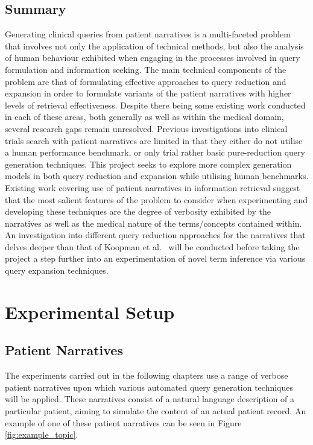 \documentclass[a4paper]{report}
\begin{document}
\section{Summary}

Generating clinical queries from patient narratives is a multi-faceted problem that involves not only the application of technical methods, but also the analysis of human behaviour exhibited when engaging in the processes involved in query formulation and information seeking. The main technical components of the problem are that of formulating effective approaches to query reduction and expansion in order to formulate variants of the patient narratives with higher levels of retrieval effectiveness. Despite there being some existing work conducted in each of these areas, both generally as well as within the medical domain, several research gaps remain unresolved. Previous investigations into clinical trials search with patient narratives are limited in that they either do not utilise a human performance benchmark, or only trial rather basic pure-reduction query generation techniques. This project seeks to explore more complex generation models in both query reduction and expansion while utilising human benchmarks. Existing work covering use of patient narratives in information retrieval suggest that the most salient features of the problem to consider when experimenting and developing these techniques are the degree of verbosity exhibited by the narratives as well as the medical nature of the terms/concepts contained within. An investigation into different query reduction approaches for the narratives that delves deeper than that of Koopman et al.~\cite{koopman2017generating} will be conducted before taking the project a step further into an experimentation of novel term inference via various query expansion techniques. 


\chapter{Experimental Setup}
\section{Patient Narratives}
The experiments carried out in the following chapters use a range of verbose patient narratives upon which various automated query generation techniques will be applied. These narratives consist of a natural language description of a particular patient, aiming to simulate the content of an actual patient record. An example of one of these patient narratives can be seen in Figure \ref{fig:example_topic}.
\end{document}
